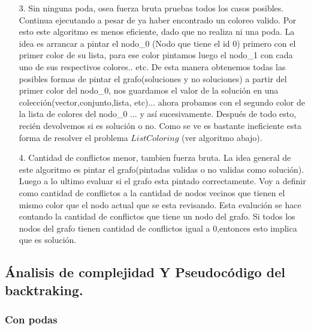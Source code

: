 \begin{itemize}
	\item[3.] Sin ninguna poda, osea fuerza bruta pruebas todos los casos posibles. Continua ejecutando a pesar de ya haber encontrado un coloreo valido. Por esto este algoritmo es menos eficiente, dado que no realiza ni una poda.\newline
	La idea es arrancar a pintar el nodo_0 (Nodo que tiene el id 0) primero con el primer color de su lista, para ese color pintamos luego el nodo_1 con cada uno de sus respectivos colores.. etc. De esta manera obtenemos todas las posibles formas de pintar el grafo(soluciones y no soluciones) a partir del primer color del nodo_0, nos guardamos el valor de la solución en una colección(vector,conjunto,lista, etc)... ahora probamos con el segundo color de la lista de colores del nodo_0 ... y así sucesivamente. \newline
	Después de todo esto, recién devolvemos si es solución o no.  Como se ve es bastante ineficiente esta forma de resolver el problema $ListColoring$ (ver algoritmo  abajo).
	\item[4.] Cantidad de conflictos menor, tambien fuerza bruta. 
	La idea general de este algoritmo es pintar el grafo(pintadas validas o no validas como solución). Luego a lo ultimo evaluar si el grafo esta pintado correctamente. \newline
	Voy a definir como cantidad de conflictos a la cantidad de nodos vecinos que tienen el mismo color que el nodo actual que se esta revisando.
	Esta evalución se hace contando la cantidad de conflictos que tiene un nodo del grafo. Si todos los nodos del grafo tienen cantidad de conflictos igual a 0,entonces esto implica que es solución.  
 \end{itemize}




\subsection{Ánalisis de complejidad Y Pseudocódigo del backtraking.}
\vspace*{0.3cm}

\subsubsection{Con podas} 

